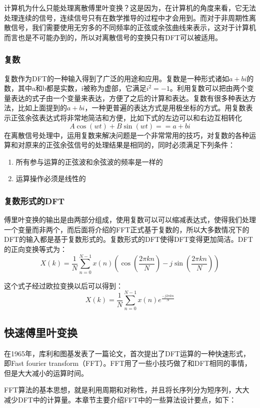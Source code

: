 计算机为什么只能处理离散傅里叶变换？这是因为，在计算机的角度来看，它无法处理连续的信号，连续信号只有在数学推导的过程中才会用到。而对于非周期性离散信号，我们需要使用无穷多的不同频率的正弦或余弦曲线来表示，这对于计算机而言也是不可能办到的，所以对离散信号的变换只有DFT可以被适用。

\subsubsection{复数}
复数作为DFT的一种输入得到了广泛的用途和应用。复数是一种形式诸如$a+bi$的数，其中a和b都是实数，i被称为虚部，它满足$i^2=-1$。利用复数可以把由两个变量表达的式子由一个变量来表达，方便了之后的计算和表达。复数有很多种表达方法，比如上面提到的$a+bi$，一种更普遍的表达方式是用极坐标的方式。用复数表示正弦余弦表达式将非常地简洁和方便，比如下式的左边可以和右边互相转化$$A\cos (wt) + B\sin (wt) == a + bi$$在离散信号处理中，运用复数来解决问题是一个非常常用的技巧，对复数的各种运算和对原来的正弦余弦信号的处理结果是相同的，同时必须满足下列条件：

\begin{enumerate}
\item 所有参与运算的正弦波和余弦波的频率是一样的
\item 运算操作必须是线性的
\end{enumerate}

\subsubsection{复数形式的DFT}
傅里叶变换的输出是由两部分组成，使用复数可以可以缩减表达式，使得我们处理一个变量而非两个，而后面将介绍的FFT正式基于复数的，所以大多数情况下的DFT的输入都是基于复数形式的。复数形式的DFT使得DFT变得更加简洁。DFT的正向变换等式为：$$X(k)=\frac{1}{N}\sum_{n=0}^{N-1}x(n)(\cos(\frac{2\pi kn}{N}) - j\sin(\frac{2\pi kn}{N}))$$

这个式子经过欧拉变换以后可以得到：$$X(k)=\frac{1}{N}\sum_{n=0}^{N-1}x(n)e^{\frac{-j2\pi kn}{N}}$$

\subsection{快速傅里叶变换}
\label{sec:FFT}

在1965年，库利和图基发表了一篇论文，首次提出了DFT运算的一种快速形式，即Fast fourier transform（FFT）。FFT用了一些小技巧做了和DFT相同的事情，但是大大减小的运算时间。

FFT算法的基本思想，就是利用周期和对称性，并且将长序列分为短序列，大大减少DFT中的计算量。本章节主要介绍FFT中的一些算法设计要点，如下：

